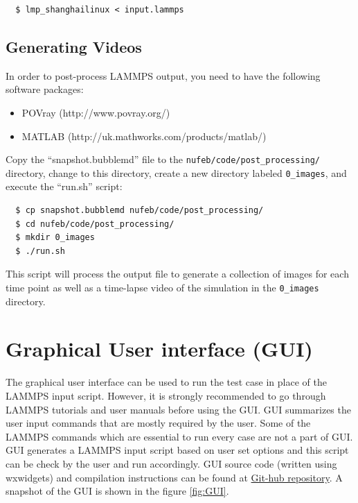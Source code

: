 \documentclass[11pt,a4paper,openright]{article}
\begin{document}
\begin{verbatim}
  $ lmp_shanghailinux < input.lammps
\end{verbatim}

\subsection{Generating Videos}

In order to post-process LAMMPS output, you need to have the following software packages:

\begin{itemize}
\item POVray (http://www.povray.org/)
\item MATLAB (http://uk.mathworks.com/products/matlab/)
\end{itemize}

\noindent
Copy the ``snapshot.bubblemd'' file to the {\tt nufeb/code/post\_processing/} directory, change to this directory, create a new directory labeled {\tt 0\_images}, and execute the ``run.sh'' script:

\begin{verbatim}
  $ cp snapshot.bubblemd nufeb/code/post_processing/
  $ cd nufeb/code/post_processing/
  $ mkdir 0_images
  $ ./run.sh
\end{verbatim}

\noindent
This script will process the output file to generate a collection of images for each time point as well as a time-lapse video of the simulation in the {\tt 0\_images} directory.


\section{Graphical User interface (GUI)}
The graphical user interface can be used to run the test case in place of the LAMMPS input script. However, it is strongly recommended to go through LAMMPS tutorials and user manuals before using the GUI. GUI summarizes the user input commands that are mostly required by the user. Some of the LAMMPS commands which are essential to run every case are not a part of GUI. GUI generates a LAMMPS input script based on user set options and this script can be check by the user and run accordingly. GUI source code (written using wxwidgets) and compilation instructions can be found at \href{https://github.com/darrenjw/nufeb/tree/master/code/gui}{Git-hub repository}. A snapshot of the GUI is shown in the figure \ref{fig:GUI}. 
\end{document}
